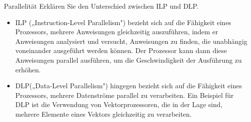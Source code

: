 \begin{aufgabe}{Parallelität}
    Erklären Sie den Unterschied zwischen ILP und DLP.
    \tcblower
    \begin{itemize}
        \item ILP („Instruction-Level Parallelism") bezieht sich auf die Fähigkeit eines Prozessors,
              mehrere Anweisungen gleichzeitig auszuführen,
              indem er Anweisungen analysiert und versucht,
              Anweisungen zu finden,
              die unabhängig voneinander ausgeführt werden können.
              Der Prozessor kann dann diese Anweisungen parallel ausführen,
              um die Geschwindigkeit der Ausführung zu erhöhen.
        \item DLP(„Data-Level Parallelism") hingegen bezieht sich auf die Fähigkeit eines Prozessors,
              mehrere Datenströme parallel zu verarbeiten.
              Ein Beispiel für DLP ist die Verwendung von Vektorprozessoren,
              die in der Lage sind,
              mehrere Elemente eines Vektors gleichzeitig zu verarbeiten.
    \end{itemize}
\end{aufgabe}